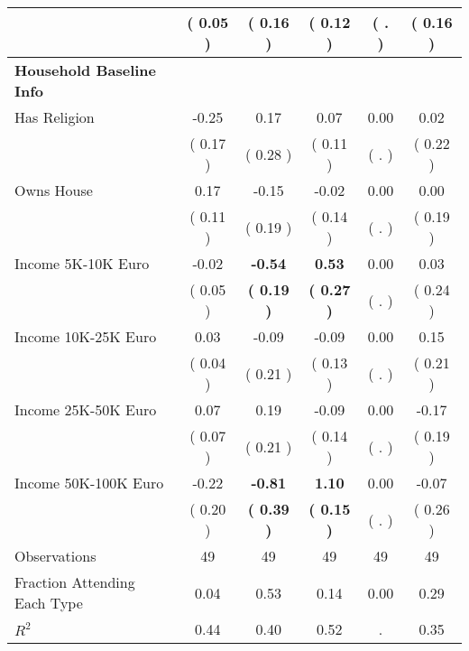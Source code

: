 \begin{table}[H]
{\begin{tabular}{lccccc}
\quad  & (     0.05 ) & \textbf{(     0.16 )}  & (     0.12 )  & (        . ) & \textbf{(     0.16 )} \\
\midrule
\textbf{Household Baseline Info} \\
\quad Has Religion &     -0.25 &      0.17 &      0.07 &      0.00 &      0.02 \\
\quad  & (     0.17 ) & (     0.28 )  & (     0.11 )  & (        . ) & (     0.22 ) \\
\quad Owns House &      0.17 &     -0.15 &     -0.02 &      0.00 &      0.00 \\
\quad  & (     0.11 ) & (     0.19 )  & (     0.14 )  & (        . ) & (     0.19 ) \\
\quad Income 5K-10K Euro &     -0.02 & \textbf{    -0.54} & \textbf{     0.53} &      0.00 &      0.03 \\
\quad  & (     0.05 ) & \textbf{(     0.19 )}  & \textbf{(     0.27 )}  & (        . ) & (     0.24 ) \\
\quad Income 10K-25K Euro &      0.03 &     -0.09 &     -0.09 &      0.00 &      0.15 \\
\quad  & (     0.04 ) & (     0.21 )  & (     0.13 )  & (        . ) & (     0.21 ) \\
\quad Income 25K-50K Euro &      0.07 &      0.19 &     -0.09 &      0.00 &     -0.17 \\
\quad  & (     0.07 ) & (     0.21 )  & (     0.14 )  & (        . ) & (     0.19 ) \\
\quad Income 50K-100K Euro &     -0.22 & \textbf{    -0.81} & \textbf{     1.10} &      0.00 &     -0.07 \\
\quad  & (     0.20 ) & \textbf{(     0.39 )}  & \textbf{(     0.15 )}  & (        . ) & (     0.26 ) \\
\midrule
Observations & 49 & 49 & 49 & 49 & 49 \\
Fraction Attending Each Type &      0.04 &      0.53 &      0.14 &      0.00 &      0.29 \\
\midrule
$ R^2$ &      0.44 &      0.40 &      0.52 &         . &      0.35 \\
\bottomrule
\end{tabular}}
\end{table}

